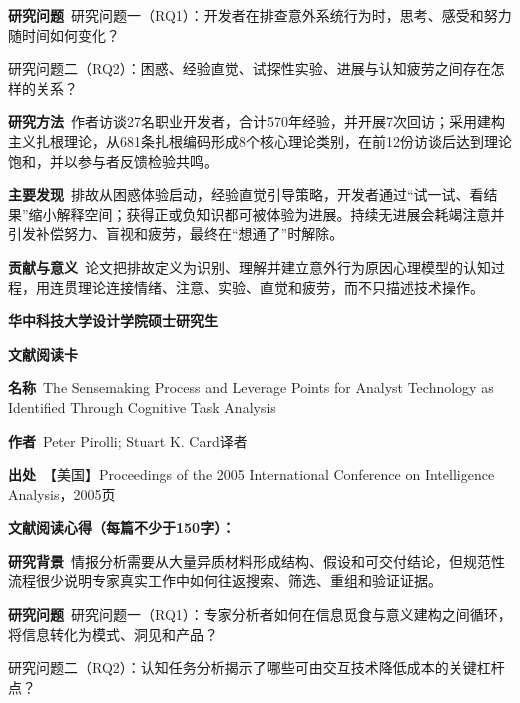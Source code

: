 \noindent\textbf{研究问题}\ 研究问题一（RQ1）：开发者在排查意外系统行为时，思考、感受和努力随时间如何变化？\par
研究问题二（RQ2）：困惑、经验直觉、试探性实验、进展与认知疲劳之间存在怎样的关系？\par
\noindent\textbf{研究方法}\ 作者访谈27名职业开发者，合计570年经验，并开展7次回访；采用建构主义扎根理论，从681条扎根编码形成8个核心理论类别，在前12份访谈后达到理论饱和，并以参与者反馈检验共鸣。\par
\noindent\textbf{主要发现}\ 排故从困惑体验启动，经验直觉引导策略，开发者通过“试一试、看结果”缩小解释空间；获得正或负知识都可被体验为进展。持续无进展会耗竭注意并引发补偿努力、盲视和疲劳，最终在“想通了”时解除。\par
\noindent\textbf{贡献与意义}\ 论文把排故定义为识别、理解并建立意外行为原因心理模型的认知过程，用连贯理论连接情绪、注意、实验、直觉和疲劳，而不只描述技术操作。\par
\clearpage
\begin{center}
{\songti\bfseries\fontsize{18.5pt}{27.75pt}\selectfont 华中科技大学设计学院硕士研究生\par}
{\songti\bfseries\fontsize{18.5pt}{27.75pt}\selectfont 文献阅读卡\par}
\end{center}
\vspace{0.25em}
\noindent\underline{}\par
\vspace{0.35em}
\noindent\textbf{名称}\ The Sensemaking Process and Leverage Points for Analyst Technology as Identified Through Cognitive Task Analysis\par
\noindent\textbf{作者}\ Peter Pirolli; Stuart K. Card\quad 译者\par
\noindent\textbf{出处}\ 【美国】Proceedings of the 2005 International Conference on Intelligence Analysis，2005\quad 页\par
\vspace{0.35em}
\noindent\textbf{文献阅读心得（每篇不少于150字）：}\par
\noindent\textbf{研究背景}\ 情报分析需要从大量异质材料形成结构、假设和可交付结论，但规范性流程很少说明专家真实工作中如何往返搜索、筛选、重组和验证证据。\par
\noindent\textbf{研究问题}\ 研究问题一（RQ1）：专家分析者如何在信息觅食与意义建构之间循环，将信息转化为模式、洞见和产品？\par
研究问题二（RQ2）：认知任务分析揭示了哪些可由交互技术降低成本的关键杠杆点？\par
